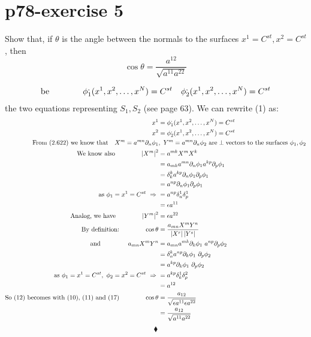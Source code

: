\section{p78-exercise 5}
\begin{tcolorbox}
Show that, if $\theta$ is the angle between the normals to the surfaces $x^1 = C^{st}, x^2 = C^{st}$, then $$ \cos \theta = \frac{a^{12}}{\sqrt{a^{11}a^{22}}}$$
\end{tcolorbox}
\begin{align}
\text{be}\quad\quad\quad\quad \phi^{,}_1(x^1,x^2,\dots,x^N) = C^{st} \quad \phi^{,}_2(x^1,x^2,\dots,x^N) = C^{st}
\end{align}
the two equations representing $S_1, S_2$ (see page 63). We can rewrite (1) as:
\begin{align}
\ x^1 &= \phi^{,}_1(x^1,x^2,\dots,x^N) = C^{st} \\
\ x^2 &= \phi^{,}_2(x^1,x^2,\dots,x^N) = C^{st}\\
\text{From (2.622) we know that}\quad X^m = a^{mn}\partial_n \phi_{1} & ,\ Y^m = a^{mn}\partial_n \phi_{2} \ \text{are}\perp\text{vectors to the surfaces}\  \phi_{1},\phi_{2}\\
\text{We know also} \spatie \left|X^m\right |^2 &= a^{mk}X^mX^k\\
\ & = a_{mk}a^{mn}\partial_n \phi_{1}a^{kp}\partial_p \phi_{1}\\
\ & = \delta^k_k a^{kp}\partial_n \phi_{1}\partial_p \phi_{1}\\
\ & = a^{np}\partial_n \phi_{1}\partial_p \phi_{1}\\
\text{as} \ \phi_1 = x^1 = C^{st} \ \Rightarrow \ &= a^{np}\delta^1_n \delta^1_p\\
\ &= \epsilon a^{11}\\
\text{Analog, we have}\spatie \left|Y^m\right |^2 &= \epsilon a^{22}\\
\text{By definition:}\spatie \cos\theta &= \frac{a_{mn}X^mY^n}{ \left|X^r\right | \left|Y^s\right |}\\
\text{and }\spatie a_{mn}X^mY^n &= a_{mn} a^{mk}\partial_k \phi_{1} \  a^{np}\partial_p \phi_{2}\\
\ &=\delta^k_n a^{np}\partial_k \phi_{1} \ \partial_p \phi_{2}\\
\ &=a^{kp}\partial_k \phi_{1} \ \partial_p \phi_{2}\\
\text{as} \ \phi_1 = x^1 = C^{st},  \ \phi_2 = x^2 = C^{st} \ \Rightarrow \ &= a^{kp}\delta^1_k\delta^2_p\\
\ &= a^{12}\\
\text{So (12) becomes with (10), (11) and (17)} \spatie \cos\theta &= \frac{a_{12}}{ \sqrt{\epsilon a^{11}\epsilon a^{22}}}\\
&= \frac{a_{12}}{ \sqrt{ a^{11} a^{22}}}
\end{align}
$$\blacklozenge$$
\newpage

